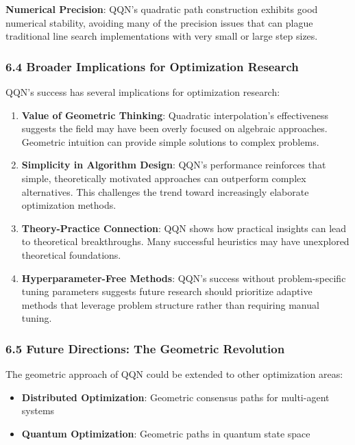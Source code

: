 \textbf{Numerical Precision}: QQN's quadratic path construction exhibits good numerical stability, avoiding many of the
precision issues that can plague traditional line search implementations with very small or large step sizes.

\hypertarget{broader-implications-for-optimization-research}{%
\subsubsection{6.4 Broader Implications for Optimization Research}\label{broader-implications-for-optimization-research}}

QQN's success has several implications for optimization research:

\begin{enumerate}
\def\labelenumi{\arabic{enumi}.}
\item
  \textbf{Value of Geometric Thinking}: Quadratic interpolation's effectiveness suggests the field may have been overly
  focused on algebraic approaches. Geometric intuition can provide simple solutions to complex problems.
\item
  \textbf{Simplicity in Algorithm Design}: QQN's performance reinforces that simple, theoretically motivated approaches can
  outperform complex alternatives. This challenges the trend toward increasingly elaborate optimization methods.
\item
  \textbf{Theory-Practice Connection}: QQN shows how practical insights can lead to theoretical breakthroughs. Many
  successful heuristics may have unexplored theoretical foundations.
\item
  \textbf{Hyperparameter-Free Methods}: QQN's success without problem-specific tuning parameters suggests future research
  should prioritize adaptive methods that leverage problem structure rather than requiring manual tuning.
\end{enumerate}

\hypertarget{future-directions-the-geometric-revolution}{%
\subsubsection{6.5 Future Directions: The Geometric Revolution}\label{future-directions-the-geometric-revolution}}

The geometric approach of QQN could be extended to other optimization areas:

\begin{itemize}
\tightlist
\item
  \textbf{Distributed Optimization}: Geometric consensus paths for multi-agent systems
\item
  \textbf{Quantum Optimization}: Geometric paths in quantum state space
\end{itemize}

